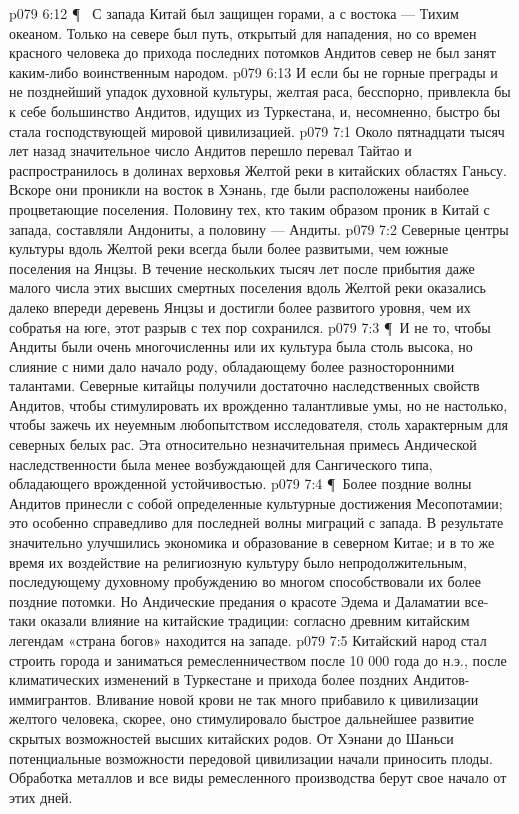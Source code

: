 \vs p079 6:12 \P\ \bibnobreakspace {} С запада Китай был защищен горами, а с востока --- Тихим океаном. Только на севере был путь, открытый для нападения, но со времен красного человека до прихода последних потомков Андитов север не был занят каким\hyp{}либо воинственным народом.
\vs p079 6:13 И если бы не горные преграды и не позднейший упадок духовной культуры, желтая раса, бесспорно, привлекла бы к себе большинство Андитов, идущих из Туркестана, и, несомненно, быстро бы стала господствующей мировой цивилизацией.
\vs p079 7:1 Около пятнадцати тысяч лет назад значительное число Андитов перешло перевал Тайтао и распространилось в долинах верховья Желтой реки в китайских областях Ганьсу. Вскоре они проникли на восток в Хэнань, где были расположены наиболее процветающие поселения. Половину тех, кто таким образом проник в Китай с запада, составляли Андониты, а половину --- Андиты.
\vs p079 7:2 Северные центры культуры вдоль Желтой реки всегда были более развитыми, чем южные поселения на Янцзы. В течение нескольких тысяч лет после прибытия даже малого числа этих высших смертных поселения вдоль Желтой реки оказались далеко впереди деревень Янцзы и достигли более развитого уровня, чем их собратья на юге, этот разрыв с тех пор сохранился.
\vs p079 7:3 \P\ И не то, чтобы Андиты были очень многочисленны или их культура была столь высока, но слияние с ними дало начало роду, обладающему более разносторонними талантами. Северные китайцы получили достаточно наследственных свойств Андитов, чтобы стимулировать их врожденно талантливые умы, но не настолько, чтобы зажечь их неуемным любопытством исследователя, столь характерным для северных белых рас. Эта относительно незначительная примесь Андической наследственности была менее возбуждающей для Сангического типа, обладающего врожденной устойчивостью.
\vs p079 7:4 \P\ Более поздние волны Андитов принесли с собой определенные культурные достижения Месопотамии; это особенно справедливо для последней волны миграций с запада. В результате значительно улучшились экономика и образование в северном Китае; и в то же время их воздействие на религиозную культуру было непродолжительным, последующему духовному пробуждению во многом способствовали их более поздние потомки. Но Андические предания о красоте Эдема и Даламатии все\hyp{}таки оказали влияние на китайские традиции: согласно древним китайским легендам «страна богов» находится на западе.
\vs p079 7:5 Китайский народ стал строить города и заниматься ремесленничеством после 10 000 года до н.э., после климатических изменений в Туркестане и прихода более поздних Андитов\hyp{}иммигрантов. Вливание новой крови не так много прибавило к цивилизации желтого человека, скорее, оно стимулировало быстрое дальнейшее развитие скрытых возможностей высших китайских родов. От Хэнани до Шаньси потенциальные возможности передовой цивилизации начали приносить плоды. Обработка металлов и все виды ремесленного производства берут свое начало от этих дней.
